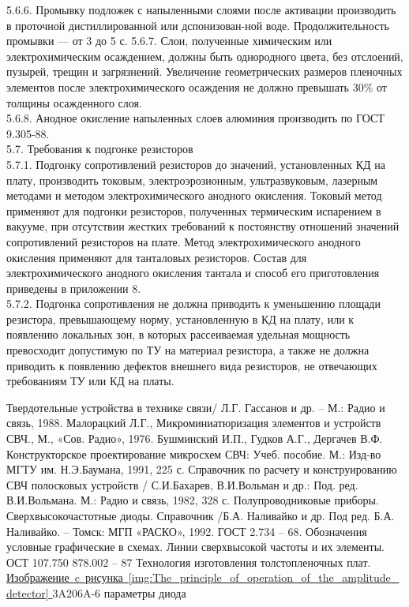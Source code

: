 \documentclass{bmstu}
\begin{document}
	5.6.6. Промывку подложек с напыленными слоями после активации производить в проточной дистиллированной или дспонизован-ной воде. Продолжительность промывки — от 3 до 5 с.
	5.6.7. Слои, полученные химическим или электрохимическим осаждением, должны быть однородного цвета, без отслоений, пузырей, трещин и загрязнений.
	Увеличение геометрических размеров пленочных элементов после электрохимического осаждения не должно превышать 30\% от толщины осажденного слоя. \\
	5.6.8. Анодное окисление напыленных слоев алюминия производить по ГОСТ 9.305-88. \\
	5.7. Требования к подгонке резисторов \\
	5.7.1. Подгонку сопротивлений резисторов до значений, установленных КД на плату, производить токовым, электроэрозионным, ультразвуковым, лазерным методами и методом электрохимического анодного окисления. Токовый метод применяют для подгонки резисторов, полученных термическим испарением в вакууме, при отсутствии жестких требований к постоянству отношений значений сопротивлений резисторов на плате. Метод электрохимического анодного окисления применяют для танталовых резисторов. Состав для электрохимического анодного окисления тантала и способ его приготовления приведены в приложении 8. \\
	5.7.2. Подгонка сопротивления не должна приводить к уменьшению площади резистора, превышающему норму, установленную в КД на плату, или к появлению локальных зон, в которых рассеиваемая удельная мощность превосходит допустимую по ТУ на материал резистора, а также не должна приводить к появлению дефектов внешнего вида резисторов, не отвечающих требованиям ТУ или КД на платы. \\
	
	
	\begin{thebibliography}{}
		 Твердотельные устройства в технике связи/ Л.Г. Гассанов и др. – М.: Радио и связь, 1988.
		 Малорацкий Л.Г., Микроминиатюризация элементов и устройств СВЧ., М., «Сов. Радио», 1976.
		 Бушминский И.П., Гудков А.Г., Дергачев В.Ф. Конструкторское проектирование микросхем СВЧ: Учеб. пособие. М.: Изд-во МГТУ им. Н.Э.Баумана, 1991, 225 с.
		 Справочник по расчету и конструированию СВЧ полосковых устройств / С.И.Бахарев, В.И.Вольман и др.: Под. ред. В.И.Вольмана. М.: Радио и связь, 1982, 328 с.
		 Полупроводниковые приборы. Сверхвысокочастотные диоды. Справочник /Б.А. Наливайко и др. Под ред. Б.А. Наливайко. – Томск: МГП «РАСКО», 1992.
		 ГОСТ 2.734 – 68. Обозначения условные графические в схемах. Линии сверхвысокой частоты и их элементы.
		 ОСТ 107.750 878.002 – 87   Технология изготовления толстопленочных плат.
		 \href{http://mart7157.narod.ru/voise_10.html}{
			Изображение~c~рисунка~\ref{img:The_principle_of_operation_of_the_amplitude_detector}
		}
		 3A206A-6 параметры диода
	\end{thebibliography}
	
	
\end{document}
